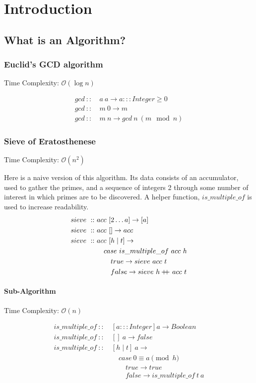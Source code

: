 \documentclass[a4paper,10pt]{book}
\newcommand\doubleplus{+\kern-1.3ex+\kern0.8ex}
\begin{document}
\mainmatter
\chapter{Introduction}
\section{What is an Algorithm?}
\subsection{Euclid's GCD algorithm}
Time Complexity: $\mathcal{O}(\log n)$

\begin{align*}
gcd\ ::\ &a\ a\rightarrow a:::Integer \ge 0\\
gcd\ ::\ &m\ 0\rightarrow m\\
gcd\ ::\ &m\ n\rightarrow gcd\ n\ (m\mod n)
\end{align*}

\subsection{Sieve of Eratosthenese}

Time Complexity: $\mathcal{O}(n^2)$

Here is a naive version of this algorithm.
Its data consists of an accumulator, used to gather the primes, and a sequence of integers 2 through some number of interest in which primes are to be discovered. A helper function, $is\_multiple\_of$ is used to increase readability.
\begin{align*}
sieve\ ::\ &acc\ [2\ldots a]\rightarrow [a]\\
sieve\ ::\ &acc\ []\rightarrow acc\\
sieve\ ::\ &acc\ [h\mid t]\rightarrow\\
	&\quad case\ is\_multiple\_of\ acc\ h\\
	&\quad\quad true\rightarrow sieve\ acc\ t\\
	&\quad\quad false\rightarrow sieve\ h\doubleplus acc\ t
\end{align*}
\subsubsection{Sub-Algorithm}
Time Complexity: $\mathcal{O}(n)$

\begin{align*}
is\_multiple\_of\ ::\ &[a:::Integer] a\rightarrow Boolean\\
is\_multiple\_of\ ::\ &[]\ a\rightarrow false\\
is\_multiple\_of\ ::\ &[h\mid t]\ a\rightarrow\\
	&\quad case\ 0\equiv a\pmod h\\
	&\quad\quad true\rightarrow true\\
	&\quad\quad false\rightarrow is\_multiple\_of\ t\ a
\end{align*}
\end{document}
